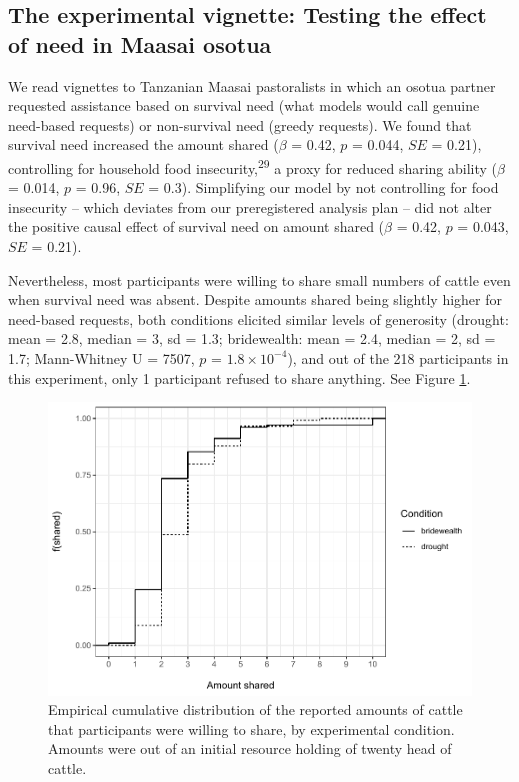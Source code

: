 \documentclass[
]{article}
\begin{document}
\subsection*{The experimental vignette: Testing the effect of need in Maasai osotua}\label{experiment}

We read vignettes to Tanzanian Maasai pastoralists in which an osotua partner requested assistance based on survival need (what models would call genuine need-based requests) or non-survival need (greedy requests). We found that survival need increased the amount shared (\(\beta\) = 0.42, \(p\) = 0.044, \(SE\) = 0.21), controlling for household food insecurity,\textsuperscript{29} a proxy for reduced sharing ability (\(\beta\) = 0.014, \(p\) = 0.96, \(SE\) = 0.3). Simplifying our model by not controlling for food insecurity -- which deviates from our preregistered analysis plan -- did not alter the positive causal effect of survival need on amount shared (\(\beta\) = 0.42, \(p\) = 0.043, \(SE\) = 0.21).

Nevertheless, most participants were willing to share small numbers of cattle even when survival need was absent. Despite amounts shared being slightly higher for need-based requests, both conditions elicited similar levels of generosity (drought: mean = 2.8, median = 3, sd = 1.3; bridewealth: mean = 2.4, median = 2, sd = 1.7; Mann-Whitney U = 7507, \(p\) = \ensuremath{1.8\times 10^{-4}}), and out of the 218 participants in this experiment, only 1 participant refused to share anything. See Figure \ref{fig:amtshareplot}.

\begin{figure}
\centering
\includegraphics{needBasedSharing-paper_files/figure-latex/amtshareplot-1.pdf}
\caption{\label{fig:amtshareplot}Empirical cumulative distribution of the reported amounts of cattle that participants were willing to share, by experimental condition. Amounts were out of an initial resource holding of twenty head of cattle.}
\end{figure}
\end{document}
